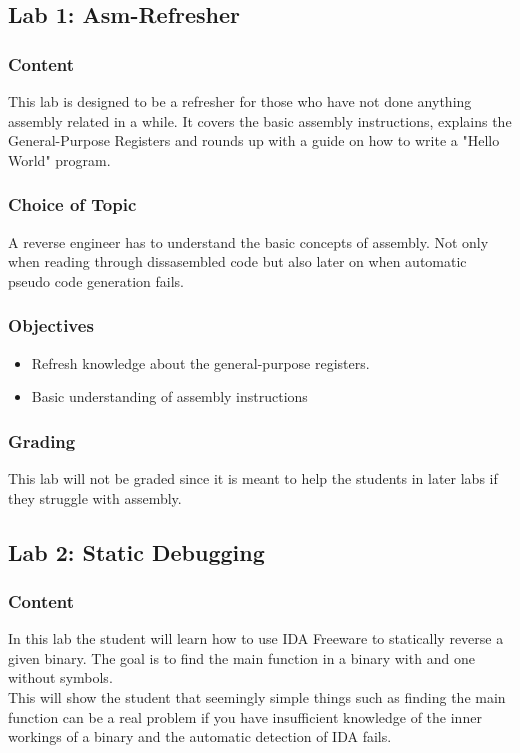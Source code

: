 
\subsection{Lab 1: Asm-Refresher}
\subsubsection*{Content}
This lab is designed to be a refresher for those who have not done anything assembly related in a while. It covers the basic assembly instructions, explains the General-Purpose Registers and rounds up with a guide on how to write a "Hello World" program.  
\subsubsection*{Choice of Topic}
A reverse engineer has to understand the basic concepts of assembly. Not only when reading through dissasembled code but also later on when automatic pseudo code generation fails.
\subsubsection*{Objectives}
\begin{itemize}
    \item Refresh knowledge about the general-purpose registers.
    \item Basic understanding of assembly instructions
\end{itemize}
\subsubsection*{Grading}
This lab will not be graded since it is meant to help the students in later labs if they struggle with assembly.

\subsection{Lab 2: Static Debugging}
\subsubsection*{Content}
In this lab the student will learn how to use IDA Freeware to statically reverse a given binary. The goal is to find the main function in a binary with and one without symbols. \\
This will show the student that seemingly simple things such as finding the main function can be a real problem if you have insufficient knowledge of the inner workings of a binary and the automatic detection of IDA fails.

